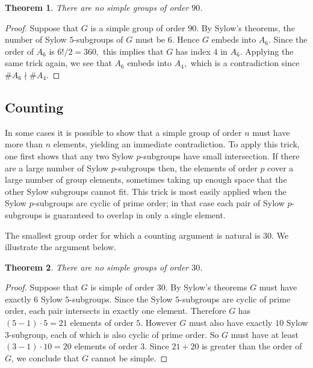 \documentclass[11pt,
oneside]{article} %
\newtheorem{theorem}{Theorem}
\begin{document}
\begin{theorem}
There are no simple groups of order $90$.
\end{theorem}

\begin{proof}
  Suppose that $G$ is a simple group of order $90$.  By Sylow's
  theorems, the number of Sylow $5$-subgroups of $G$ must be $6$.
  Hence $G$ embeds into $A_6$.  Since the order of $A_6$ is
  $6!/2 = 360,$ this implies that $G$ has index $4$ in $A_6.$ Applying
  the same trick again, we see that $A_6$ embeds into $A_4,$ which is
  a contradiction since $\# A_6 \nmid \# A_4.$
\end{proof}

\subsection{Counting}

In some cases it is possible to show that a simple group of order $n$
must have more than $n$ elements, yielding an immediate contradiction.
To apply this trick, one first shows that any two Sylow $p$-subgroups
have small intersection.  If there are a large number of Sylow
$p$-subgroups then, the elements of order $p$ cover a large number of
group elements, sometimes taking up enough space that the other Sylow
subgroups cannot fit.  This trick is most easily applied when the
Sylow $p$-subgroups are cyclic of prime order; in that case each pair
of Sylow $p$-subgroups is guaranteed to overlap in only a single
element.

The smallest group order for which a counting argument is natural is $30.$  We illustrate the argument below.
\begin{theorem}
There are no simple groups of order $30$.
\end{theorem}

\begin{proof}
  Suppose that $G$ is simple of order $30$.  By Sylow's theorems $G$
  must have exactly $6$ Sylow $5$-subgroups.  Since the Sylow
  $5$-subgroups are cyclic of prime order, each pair intersects in
  exactly one element.  Therefore $G$ has $(5-1) \cdot 5 = 21$
  elements of order $5$.  However $G$ must also have exactly $10$
  Sylow $3$-subgroup, each of which is also cyclic of prime order.  So
  $G$ must have at least $(3-1)\cdot 10 = 20$ elements of order $3$.
  Since $21 + 20$ is greater than the order of $G$, we conclude that
  $G$ cannot be simple.
\end{proof}
\end{document}
